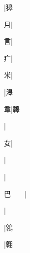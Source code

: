 \begin{multicols}{2}
{{}|{\cjk{}獆}\par
{\cjk{}{\cnsym{}　}{\cnsym{}　}月}|{}\par
{\cjk{}{\cnsym{}　}{\cnsym{}　}言}|{}\par
{\cjk{}{\cnsym{}　}{\cnsym{}　}疒}|{}\par
{\cjk{}{\cnsym{}　}{\cnsym{}　}米}|{}\par
{}|{\cjk{}滜}\par
{\cjk{}{\cnsym{}　}{\cnsym{}　}韋}|{\cjk{}韟}\par
{}|{}\par
{\cjk{}{\cnsym{}　}{\cnsym{}　}女}|{}\par
{\cjk{}{\cnsym{}　}{\cnsym{}　}{\cnsym{}　}}|{}\par
{}|{}\par
{\cjk{}巴{\cnsym{}　}{\cnsym{}　}}|{}\par
{\cjk{}{\cnsym{}　}{\cnsym{}　}{\cnsym{}　}}|{}\par
{\cjk{}{\cnsym{}　}{\cnsym{}　}{\cnsym{}　}}|{\cjk{}鷎}\par
{\cjk{}{\cnsym{}　}{\cnsym{}　}{\cnsym{}　}}|{\cjk{}翱}\par
}
\end{multicols}
